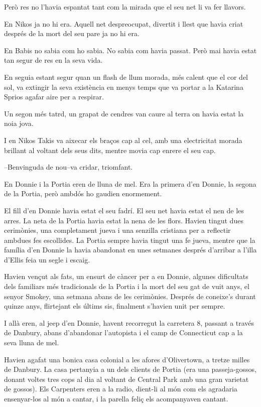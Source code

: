 Però res no l'havia espantat tant com la mirada que el seu net li va fer
llavors.

En Nikos ja no hi era. Aquell net despreocupat, divertit i llest que
havia criat després de la mort del seu pare ja no hi era.

En Babis no sabia com ho sabia. No sabia com havia passat. Però mai
havia estat tan segur de res en la seva vida.

En seguia estant segur quan un flash de llum morada, més calent que el
cor del sol, va extingir la seva existència en menys temps que va portar
a la Katarina Sprios agafar aire per a respirar.

Un segon més tatrd, un grapat de cendres van caure al terra on havia
estat la noia jova.

I en Nikos Takis va aixecar els braços cap al cel, amb una electricitat
morada brillant al voltant dels seus dits, mentre movia cap enrere el
seu cap.

--Benvinguda de nou--va cridar, triomfant.

En Donnie i la Portia eren de lluna de mel. Era la primera d'en Donnie,
la segona de la Portia, però ambdós ho gaudien enormement.

El fill d'en Donnie havia estat el seu fadrí. El seu net havia estat el
nen de les arres. La neta de la Portia havia estat la nena de les flors.
Havien tingut dues cerimònies, una completament jueva i una senzilla
cristiana per a reflectir ambdues fes escollides. La Portia sempre havia
tingut una fe jueva, mentre que la família d'en Donnie la havia
abandonat en unes setmanes després d'arribar a l'illa d'Ellis feia un
segle i escaig.

Havien vençut als fats, un ensurt de càncer per a en Donnie, algunes
dificultats dels familiars més tradicionals de la Portia i la mort del
seu gat de vuit anys, el senyor Smokey, una setmana abans de les
cerimònies. Després de coneixe's durant quinze anys, flirtejant els
últims sis, finalment s'havien unit per sempre.

I allà eren, al jeep d'en Donnie, havent recorregut la carretera 8,
passant a través de Danbury, abans d'abandonar l'autopista i el camp de
Connecticut cap a la seva lluna de mel.

Havien agafat una bonica casa colonial a les afores d'Olivertown, a
tretze milles de Danbury. La casa pertanyia a un dels clients de Portia
(era una passeja-gossos, donant voltes tres cops al dia al voltant de
Central Park amb una gran varietat de gossos). Els Carpenters eren a la
radio, dient-li al món com els agradaria ensenyar-los al món a cantar, i
la parella feliç els acompanyaven cantant.

